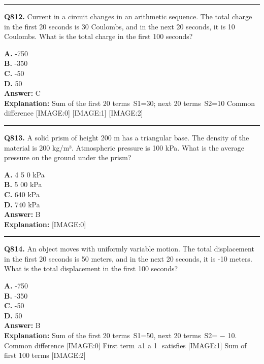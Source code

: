 \documentclass[12pt]{article}
\begin{document}
\hrule
\vspace{1em}


\noindent
\textbf{Q812.} Current in a circuit changes in an arithmetic sequence. The total charge in the first 20 seconds is 30 Coulombs, and in the next 20 seconds, it is 10 Coulombs. What is the total charge in the first 100 seconds?



\textbf{A.} -750 \\
\textbf{B.} -350 \\
\textbf{C.} -50 \\
\textbf{D.} 50 \\

\textbf{Answer:} C \\
\textbf{Explanation:} Sum of the first 20 terms S1=30; next 20 terms S2=10 Common difference
[IMAGE:0]
[IMAGE:1]
[IMAGE:2]

\hrule
\vspace{1em}


\noindent
\textbf{Q813.} A solid prism of height 200 m has a triangular base. The density of the material is 200 kg/m³. Atmospheric pressure is 100 kPa. What is the average pressure on the ground under the prism?



\textbf{A.} 4
5
0 kPa \\
\textbf{B.} 5
00
kPa \\
\textbf{C.} 640 kPa \\
\textbf{D.} 740 kPa \\

\textbf{Answer:} B \\
\textbf{Explanation:} [IMAGE:0]

\hrule
\vspace{1em}


\noindent
\textbf{Q814.} An object moves with uniformly variable motion. The total displacement in the first 20 seconds is 50 meters, and in the next 20 seconds, it is -10 meters. What is the total displacement in the first 100 seconds?



\textbf{A.} -750 \\
\textbf{B.} -350 \\
\textbf{C.} -50 \\
\textbf{D.} 50 \\

\textbf{Answer:} B \\
\textbf{Explanation:} Sum of the first 20 terms S1=50,
next 20 terms S2=
−
10.
Common difference
[IMAGE:0]
First term a1
a
1
​
satisfies
[IMAGE:1]
Sum of first 100 terms
[IMAGE:2]
\end{document}
